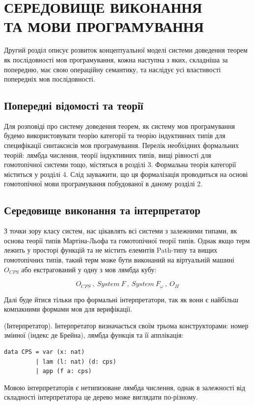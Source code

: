 
\chapter{СЕРЕДОВИЩЕ ВИКОНАННЯ \\ТА МОВИ ПРОГРАМУВАННЯ}

Другий розділ описує розвиток концептуальної моделі системи доведення теорем
як послідовності мов програмування, кожна наступна з яких, складніша за попередню,
має свою операційну семантику, та наслідує усі властивості попередніх мов послідовності.

\section{Попередні відомості та теорії}

Для розповіді про систему доведення теорем, як систему мов програмування
будемо використовувати теорію категорії та теорію індуктивних
типів для специфікації синтаксисів мов програмування. Перелік необхідних формальних теорій:
лямбда числення, теорії індуктивних типів, вищі рівності для гомотопічної системи
тощо, містяться в розділі 3. Формальна теорія категорії міститься у розділі 4.
Слід зауважити, що ця формалізація проводиться на основі гомотопічної
мови програмування побудованої в даному розділі 2.

\section*{Середовище виконання та інтерпретатор}

З точки зору класу систем, нас цікавлять всі системи з залежними типами,
як основа теорії типів Мартіна-Льофа та гомотопічної теорії типів. Однак
якщо терм лежить у просторі функцій та не містить елемнтів Path-типу та
вищих гомотопічних типів, такий терм може бути виконаний
на віртуальній машині $O_{CPS}$ або екстрагований у одну з мов лямбда кубу:

$$
O_{CPS}\ ,\ System\ {F}\ ,\ System\ {F_\omega}\ ,\ O_{\Pi}
$$

Далі буде йтися тільки про формальні інтерпретатори,
так як вони є найбільш компакними формами мов для верифікації.

\begin{definition} (Інтерпретатор). Інтерпретатор визначається
своїм трьома конструкторами: номер змінної (індекс де Брейна),
лямбда функція та її апплікація:
\begin{lstlisting}
data CPS = var (x: nat)
         | lam (l: nat) (d: cps)
         | app (f a: cps)
\end{lstlisting}
Мовою інтерпретаторів є нетипизоване лямбда числення, однак в залежності
від складності інтерпретатора це дерево може виглядати по-різному.
\end{definition}


